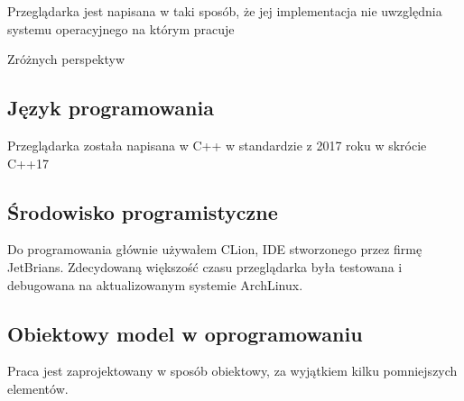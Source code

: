 Przeglądarka jest napisana w taki sposób, że jej implementacja nie uwzględnia systemu operacyjnego na którym pracuje

Zróżnych perspektyw

\subsection{Język programowania}

Przeglądarka została napisana w C++ w standardzie z 2017 roku w skrócie C++17

\subsection{Środowisko programistyczne}

Do programowania głównie używałem CLion, IDE stworzonego przez firmę JetBrians.
Zdecydowaną większość czasu przeglądarka była testowana i debugowana na aktualizowanym systemie ArchLinux.

\subsection{Obiektowy model w oprogramowaniu}

Praca jest zaprojektowany w sposób obiektowy, za wyjątkiem kilku pomniejszych elementów.